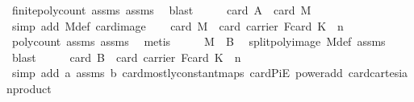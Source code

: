 \begin{isabellebody}
\ finite{\isacharunderscore}{\kern0pt}poly{\isacharunderscore}{\kern0pt}count\ assms{\isacharparenleft}{\kern0pt}{}{\isacharparenright}{\kern0pt}\ assms{\isacharparenleft}{\kern0pt}{}{\isacharparenright}{\kern0pt}\ \isamarkupfalse%
\ blast\isanewline
\ \ \isamarkupfalse%
\ \isamarkupfalse%
\ {\isachardoublequoteopen}card\ {\isacharquery}{\kern0pt}A\ {\isacharequal}{\kern0pt}\ card\ M{\isachardoublequoteclose}\ \isamarkupfalse%
\ {\isacharparenleft}{\kern0pt}simp\ add{\isacharcolon}{\kern0pt}\ M{\isacharunderscore}{\kern0pt}def\ card{\isacharunderscore}{\kern0pt}image{\isacharparenright}{\kern0pt}\isanewline
\ \ \isamarkupfalse%
\ {\isachardoublequoteopen}card\ M\ {\isacharequal}{\kern0pt}\ card\ {\isacharparenleft}{\kern0pt}carrier\ F{\isacharparenright}{\kern0pt}{\isacharcircum}{\kern0pt}{\isacharparenleft}{\kern0pt}card\ K\ {\isacharplus}{\kern0pt}\ n{\isacharparenright}{\kern0pt}{\isachardoublequoteclose}\isanewline
\ \ \ \ \isamarkupfalse%
\ poly{\isacharunderscore}{\kern0pt}count\ assms{\isacharparenleft}{\kern0pt}{}{\isacharparenright}{\kern0pt}\ assms{\isacharparenleft}{\kern0pt}{}{\isacharparenright}{\kern0pt}\ \isamarkupfalse%
\ metis\isanewline
\ \ \isamarkupfalse%
\ \isamarkupfalse%
\ {\isachardoublequoteopen}M\ {\isasymsubseteq}\ {\isacharquery}{\kern0pt}B{\isachardoublequoteclose}\ \isamarkupfalse%
\ split{\isacharunderscore}{\kern0pt}poly{\isacharunderscore}{\kern0pt}image\ M{\isacharunderscore}{\kern0pt}def\ assms\ \isamarkupfalse%
\ blast\isanewline
\ \ \isamarkupfalse%
\ \isamarkupfalse%
\ {\isachardoublequoteopen}card\ {\isacharquery}{\kern0pt}B\ {\isacharequal}{\kern0pt}\ card\ {\isacharparenleft}{\kern0pt}carrier\ F{\isacharparenright}{\kern0pt}{\isacharcircum}{\kern0pt}{\isacharparenleft}{\kern0pt}card\ K\ {\isacharplus}{\kern0pt}\ n{\isacharparenright}{\kern0pt}{\isachardoublequoteclose}\ \isanewline
\ \ \ \ \isamarkupfalse%
\ {\isacharparenleft}{\kern0pt}simp\ add{\isacharcolon}{\kern0pt}\ a\ assms\ b\ card{\isacharunderscore}{\kern0pt}mostly{\isacharunderscore}{\kern0pt}constant{\isacharunderscore}{\kern0pt}maps\ card{\isacharunderscore}{\kern0pt}PiE\ power{\isacharunderscore}{\kern0pt}add\ card{\isacharunderscore}{\kern0pt}cartesian{\isacharunderscore}{\kern0pt}product{\isacharparenright}{\kern0pt}\ \isanewline
\ \ \isamarkupfalse%

\end{isabellebody}
